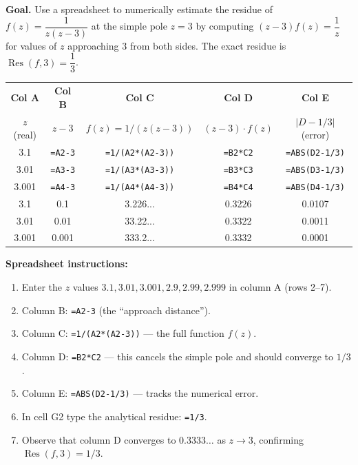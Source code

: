 \documentclass[12pt,a4paper]{article}
\begin{document}
\textbf{Goal.} Use a spreadsheet to numerically estimate the residue of
$f(z) = \dfrac{1}{z(z-3)}$ at the simple pole $z = 3$ by computing
$(z-3)f(z) = \dfrac{1}{z}$ for values of $z$ approaching 3 from both sides.
The exact residue is $\operatorname{Res}(f,3) = \dfrac{1}{3}$.

\begin{center}
\begin{tabular}{@{}ccccc@{}}
\toprule
\textbf{Col A} & \textbf{Col B} & \textbf{Col C} & \textbf{Col D} & \textbf{Col E} \\
$z$ (real) & $z - 3$ & $f(z) = 1/(z(z-3))$ & $(z-3) \cdot f(z)$ & $|D - 1/3|$ (error) \\
\midrule
3.1  & \texttt{=A2-3}  & \texttt{=1/(A2*(A2-3))}  & \texttt{=B2*C2}  & \texttt{=ABS(D2-1/3)} \\
3.01 & \texttt{=A3-3}  & \texttt{=1/(A3*(A3-3))}  & \texttt{=B3*C3}  & \texttt{=ABS(D3-1/3)} \\
3.001& \texttt{=A4-3}  & \texttt{=1/(A4*(A4-3))}  & \texttt{=B4*C4}  & \texttt{=ABS(D4-1/3)} \\
\midrule
3.1  & 0.1    & 3.226... & 0.3226 & 0.0107 \\
3.01 & 0.01   & 33.22... & 0.3322 & 0.0011 \\
3.001& 0.001  & 333.2... & 0.3332 & 0.0001 \\
\bottomrule
\end{tabular}
\end{center}

\textbf{Spreadsheet instructions:}
\begin{enumerate}[leftmargin=*]
  \item Enter the $z$ values $3.1, 3.01, 3.001, 2.9, 2.99, 2.999$ in column A (rows 2--7).
  \item Column B: \texttt{=A2-3} (the ``approach distance'').
  \item Column C: \texttt{=1/(A2*(A2-3))} --- the full function $f(z)$.
  \item Column D: \texttt{=B2*C2} --- this cancels the simple pole and should converge to $1/3$.
  \item Column E: \texttt{=ABS(D2-1/3)} --- tracks the numerical error.
  \item In cell G2 type the analytical residue: \texttt{=1/3}.
  \item Observe that column D converges to $0.3333\ldots$ as $z \to 3$, confirming
        $\operatorname{Res}(f,3) = 1/3$.
\end{enumerate}
\end{document}
